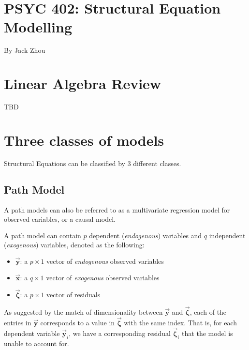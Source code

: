 \documentclass{article}
\begin{document}
\section*{PSYC 402: Structural Equation Modelling}

By Jack Zhou

\begin{multicols*}{2}




\section{Linear Algebra Review}

TBD

\section{Three classes of models}

Structural Equations can be classified by 3 different classes.

\subsection{Path Model}

A path models can also be referred to as a multivariate regression model for observed cariables, or a causal model.

A path model can contain $p$ dependent (\textit{endogenous}) variables and $q$ independent (\textit{exogenous}) variables, denoted as the following:

\begin{itemize}
    \item $\mathbf{\vec{y}}$: a $p \times 1$ vector of \textit{endogenous} observed variables
    \item $\mathbf{\vec{x}}$: a $q \times 1$ vector of \textit{exogenous} observed variables
    \item $\mathbf{\vec{\zeta}}$: a $p \times 1$ vector of residuals
\end{itemize}

As suggested by the match of dimensionality between $\mathbf{\vec{y}}$ and $\mathbf{\vec{\zeta}}$, each of the entries in $\mathbf{\vec{y}}$ corresponds to a value in $\mathbf{\vec{\zeta}}$ with the same index. That is, for each dependent variable $\mathbf{\vec{y}}_i$, we have a corresponding residual $\mathbf{\vec{\zeta}}_i$ that the model is unable to account for.


\end{multicols*}
\end{document}
